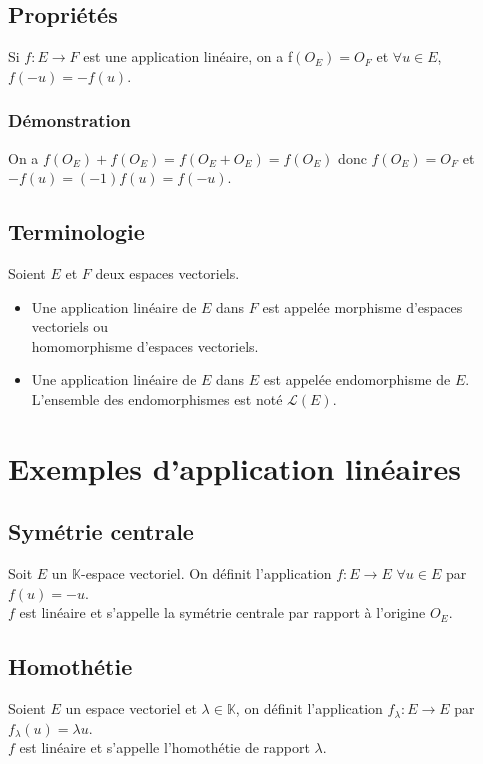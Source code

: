 \documentclass[a4paper,10pt]{book} %
\newcommand{\K}{\mathbb{K}}
\begin{document}
\newpage

\subsection{Propriétés}
Si $f :E\rightarrow F$ est une application linéaire, on a f$(O_E)=O_F$ et $\forall u\in E$, $f(-u)=-f(u)$.

\subsubsection{Démonstration}
On a $f(O_E)+f(O_E)=f(O_E+O_E)=f(O_E)$ donc $f(O_E)=O_F$
et $-f(u)=(-1)f(u)=f(-u)$.

\subsection{Terminologie}
Soient $E$ et $F$ deux espaces vectoriels.\\
\begin{itemize}[label=$\cdot$]
\item Une application linéaire de $E$ dans $F$ est appelée morphisme d'espaces vectoriels ou\\
homomorphisme d'espaces vectoriels.\\

\item Une application linéaire de $E$ dans $E$ est appelée endomorphisme de $E$.\\
L'ensemble des endomorphismes est noté $\mathcal{L}(E)$.
\end{itemize}

\section{Exemples d'application linéaires}
\subsection{Symétrie centrale}
Soit $E$ un $\K$-espace vectoriel. On définit l'application $f:E\rightarrow E$ $\forall u\in E$ par $f(u)=-u$.\\
$f$ est linéaire et s'appelle la symétrie centrale par rapport à l'origine $O_E$.

\subsection{Homothétie}
Soient $E$ un espace vectoriel et $\lambda\in \K$, on définit l'application $f_\lambda:E\rightarrow E$ par $f_\lambda (u)=\lambda u$.\\
$f$ est linéaire et s'appelle l'homothétie de rapport $\lambda$.\\
\end{document}
